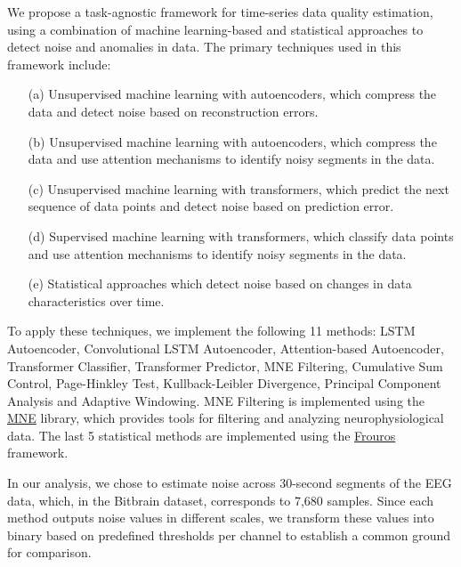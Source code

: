 We propose a task-agnostic framework for time-series data quality estimation, using a combination of machine learning-based and statistical approaches to detect noise and anomalies in data. The primary techniques used in this framework include:

\begin{enumerate}
    \item[(a)] Unsupervised machine learning with autoencoders, which compress the data and detect noise based on reconstruction errors.\\
    \vspace{-0.8cm}
    \item[(b)] Unsupervised machine learning with autoencoders, which compress the data and use attention mechanisms to identify noisy segments in the data.\\
    \vspace{-0.8cm}
    \item[(c)] Unsupervised machine learning with transformers, which predict the next sequence of data points and detect noise based on prediction error.\\
    \vspace{-0.8cm}
    \item[(d)] Supervised machine learning with transformers, which classify data points and use attention mechanisms to identify noisy segments in the data.\\
    \vspace{-0.8cm}
    \item[(e)] Statistical approaches which detect noise based on changes in data characteristics over time.
\end{enumerate}

To apply these techniques, we implement the following 11 methods: LSTM Autoencoder, Convolutional LSTM Autoencoder, Attention-based Autoencoder, Transformer Classifier, Transformer Predictor, MNE Filtering, Cumulative Sum Control, Page-Hinkley Test, Kullback-Leibler Divergence, Principal Component Analysis and Adaptive Windowing. MNE Filtering is implemented using the \href{https://mne.tools/stable/index.html}{MNE} library, which provides tools for filtering and analyzing neurophysiological data. The last 5 statistical methods are implemented using the \href{https://github.com/IFCA-Advanced-Computing/frouros}{Frouros} framework.

In our analysis, we chose to estimate noise across 30-second segments of the EEG data, which, in the Bitbrain dataset, corresponds to 7,680 samples. Since each method outputs noise values in different scales, we transform these values into binary based on predefined thresholds per channel to establish a common ground for comparison.

